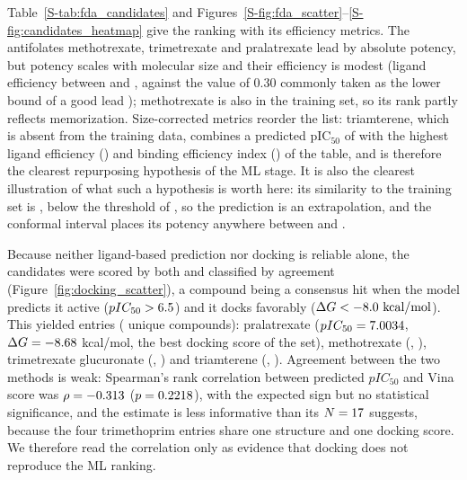 Table~\ref{S-tab:fda_candidates} and Figures~\ref{S-fig:fda_scatter}--\ref{S-fig:candidates_heatmap} give the ranking with its efficiency metrics. The antifolates methotrexate, trimetrexate and pralatrexate lead by absolute potency, but potency scales with molecular size and their efficiency is modest (ligand efficiency between \AntifolateLEMin{} and \AntifolateLEMax{}, against the value of 0.30 commonly taken as the lower bound of a good lead \citep{hopkins2004, hopkins2014}); methotrexate is also in the training set, so its rank partly reflects memorization. Size-corrected metrics reorder the list: triamterene, which is absent from the training data, combines a predicted pIC$_{50}$ of \CandTriamterenePred{} with the highest ligand efficiency (\CandTriamtereneLE{}) and binding efficiency index (\CandTriamtereneBEI{}) of the table, and is therefore the clearest repurposing hypothesis of the ML stage. It is also the clearest illustration of what such a hypothesis is worth here: its similarity to the training set is \CandTriamtereneSim{}, below the threshold of \ScreenADMinSimilarity{}, so the prediction is an extrapolation, and the conformal interval places its potency anywhere between \CandTriamtereneLower{} and \CandTriamtereneUpper{}.

Because neither ligand-based prediction nor docking is reliable alone, the \DockNTotal{} candidates were scored by both and classified by agreement (Figure~\ref{fig:docking_scatter}), a compound being a consensus hit when the model predicts it active ($pIC_{50} > 6.5$) and it docks favorably ($\Delta G < -8.0\text{ kcal/mol}$). This yielded \DockNValidated{} entries (\DockNValidatedUnique{} unique compounds): pralatrexate ($pIC_{50} = 7.0034$, $\Delta G = -8.68$ kcal/mol, the best docking score of the set), methotrexate (\MethotrexateMLpIC, \MethotrexateDockScore), trimetrexate glucuronate (\TrimetrexateMLpIC, \TrimetrexateDockScore) and triamterene (\TriamtereneMLpIC, \TriamtereneDockScore). Agreement between the two methods is weak: Spearman's rank correlation between predicted $pIC_{50}$ and Vina score was $\rho = -0.313$ ($p = 0.2218$), with the expected sign but no statistical significance, and the estimate is less informative than its $N = 17$ suggests, because the four trimethoprim entries share one structure and one docking score. We therefore read the correlation only as evidence that docking does not reproduce the ML ranking.

